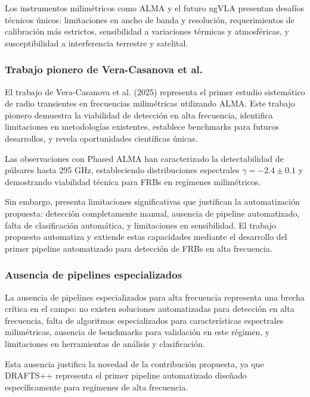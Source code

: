 Los instrumentos milimétricos como ALMA y el futuro ngVLA presentan desafíos técnicos únicos: limitaciones en ancho de banda y resolución, requerimientos de calibración más estrictos, sensibilidad a variaciones térmicas y atmosféricas, y susceptibilidad a interferencia terrestre y satelital.

\subsubsection{Trabajo pionero de Vera-Casanova et al.}

El trabajo de Vera-Casanova et al. (2025) \cite{veracasanova2025} representa el primer estudio sistemático de radio transientes en frecuencias milimétricas utilizando ALMA. Este trabajo pionero demuestra la viabilidad de detección en alta frecuencia, identifica limitaciones en metodologías existentes, establece benchmarks para futuros desarrollos, y revela oportunidades científicas únicas.

Las observaciones con Phased ALMA \cite{veracasanova2025} han caracterizado la detectabilidad de púlsares hasta 295 GHz, estableciendo distribuciones espectrales $\gamma=-2.4\pm0.1$ y demostrando viabilidad técnica para FRBs en regímenes milimétricos.

Sin embargo, presenta limitaciones significativas que justifican la automatización propuesta: detección completamente manual, ausencia de pipeline automatizado, falta de clasificación automática, y limitaciones en sensibilidad. El trabajo propuesto automatiza y extiende estas capacidades mediante el desarrollo del primer pipeline automatizado para detección de FRBs en alta frecuencia.

\subsubsection{Ausencia de pipelines especializados}

La ausencia de pipelines especializados para alta frecuencia representa una brecha crítica en el campo: no existen soluciones automatizadas para detección en alta frecuencia, falta de algoritmos especializados para características espectrales milimétricas, ausencia de benchmarks para validación en este régimen, y limitaciones en herramientas de análisis y clasificación.

Esta ausencia justifica la novedad de la contribución propuesta, ya que DRAFTS++ representa el primer pipeline automatizado diseñado específicamente para regímenes de alta frecuencia.

